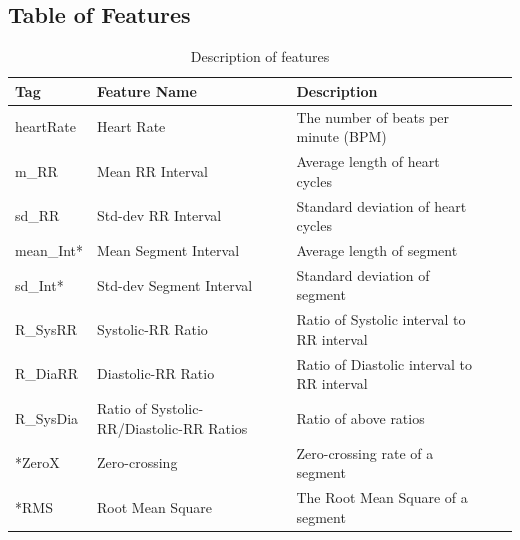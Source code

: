 \documentclass[titlepage, 12pt]{scrartcl} \usepackage{enumitem}
\begin{document}
\subsection{Table of Features}\label{appendixA}
\begin{table}[H]
\centering
\caption{Description of features}
\onehalfspacing
\tiny
\label{my-label}
\begin{tabulary}{\linewidth}{LLLLL}
\hline
Tag                        & Feature Name                                    & Description                                                                          \\ \hline
heartRate                  & Heart Rate                                      & The number of beats per minute (BPM)                                                 \\
m\_RR                      & Mean RR Interval                                & Average length of heart cycles                                                       \\
sd\_RR                     & Std-dev RR Interval                             & Standard deviation of heart cycles                                                   \\
mean\_Int*                 & Mean Segment Interval                           & Average length of segment                                                            \\
sd\_Int*                   & Std-dev Segment Interval                        & Standard deviation of segment                                                        \\
R\_SysRR                   & Systolic-RR Ratio                               & Ratio of Systolic interval to RR interval                                            \\
R\_DiaRR                   & Diastolic-RR Ratio                              & Ratio of Diastolic interval to RR interval                                           \\
R\_SysDia                  & Ratio of Systolic-RR/Diastolic-RR Ratios        & Ratio of above ratios                                                                \\
*ZeroX                     & Zero-crossing                                   & Zero-crossing rate of a segment                                                      \\
*RMS                       & Root Mean Square                                & The Root Mean Square of a segment                                                    \\

\end{tabulary}
\end{table}
\end{document}
